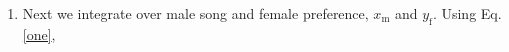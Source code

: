 \documentclass{article}
\newcommand{\x}[1]{\text{#1}}
\begin{document}
\begin{pf}
\begin{enumerate}
\begin{align*}
\begin{array}{cc}
 \end{array}\right)
 \\\text{ and } \Sigma_{y\x{m},y\x{f}}&=\left(\begin{array}{cc}\left(\frac{(\sigma^2+\sigma_{x\x{m}}^2)^2-\rho_\x{m}^2\sigma_{x\x{m}}^2(\sigma^2+\sigma_{x\x{m}}^2)+\rho_\x{m}^2\sigma_{x\x{m}}^2\sigma_{y\x{f}}^2}{(\sigma^2+\sigma_{x\x{m}}^2)^2}\right)\sigma_{y\x{m}}^2 & \frac{\rho_\x{m}\sigma_{x\x{m}}\sigma_{y\x{m}}\sigma_{y\x{f}}^2}{\sigma^2+\sigma_{x\x{m}}^2}
 \\\frac{\rho_\x{m}\sigma_{x\x{m}}\sigma_{y\x{m}}\sigma_{y\x{f}}^2}{\sigma^2+\sigma_{x\x{m}}^2} & \sigma_{y\x{f}}^2 \end{array}\right).
\end{align*}

\item Next we integrate over male song and female preference, $x_\x{m}$ and $y_\x{f}$. Using Eq. \ref{one},


\end{enumerate}
\end{pf}
\end{document}
